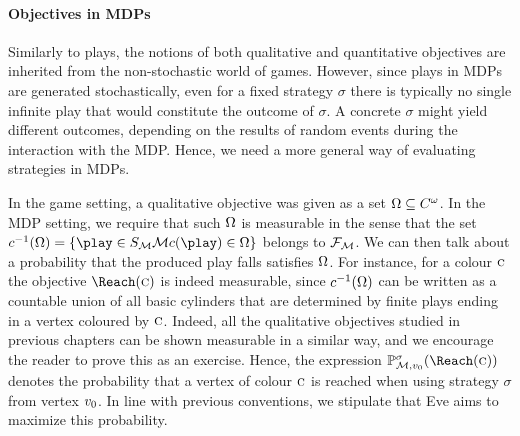\paragraph{Objectives in MDPs}

Similarly to plays, the notions of both qualitative and quantitative objectives 
are inherited from the non-stochastic world of games. However, since plays in 
MDPs are generated stochastically, even for a fixed strategy $\sigma$ there is 
typically no single infinite play that would constitute the outcome of 
$\sigma$. A concrete $\sigma$ might yield different outcomes, depending on the 
results of random events during the interaction with the MDP. Hence, we need a 
more general way of evaluating strategies in MDPs. 

In the game setting, a qualitative objective was given as a set $\Omega
\subseteq C^{\omega}$. In the MDP setting, we require that such 
$\Omega$ is measurable in the sense that the set $\colouring^{-1}(\objective) = \{\play \in \sampleSpace_{\mdp} \mdp \colouring(\play) \in \objective \}$ belongs to $\mathcal{F}_{\mathcal{M}}$. We can then talk about a 
probability that the produced play falls satisfies $\Omega$. For instance, for a 
colour $\textsc{c}$ the objective $ \Reach(\genColour) $ is indeed measurable, since $ c^{-1}(\Omega) $ can be written as a countable union of all basic cylinders that are determined by finite plays ending in a vertex coloured by $ \textsc{c} $. Indeed, all the qualitative objectives studied in previous chapters can be shown measurable in a similar way, and we encourage the reader to prove this as an exercise.
Hence, the expression 
$\probm^{\sigma}_{\mdp,\vinit}(\Reach(\genColour))$ 
denotes the probability that a vertex of colour $\textsc{c}$ is reached when 
using 
strategy $\sigma$ from vertex $v_0$. 
In line with previous conventions, we 
stipulate that Eve aims to maximize this probability. 

